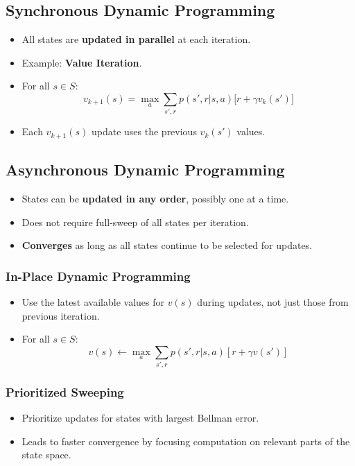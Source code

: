 \documentclass[12pt]{article}
\begin{document}
\subsection{Synchronous Dynamic Programming}
\begin{itemize}
    \item All states are \textbf{updated in parallel} at each iteration.
    \item Example: \textbf{Value Iteration}.
    \item For all $s \in S$:
        $$
        v_{k+1}(s) = \max_{a} \sum_{s',r} p(s',r|s,a)\big[r + \gamma v_k(s')\big]
        $$
    \item Each $v_{k+1}(s)$ update uses the previous $v_k(s')$ values.
\end{itemize}

\subsection{Asynchronous Dynamic Programming}
\begin{itemize}
    \item States can be \textbf{updated in any order}, possibly one at a time.
    \item Does not require full-sweep of all states per iteration.
    \item \textbf{Converges} as long as all states continue to be selected for updates.
\end{itemize}

\subsubsection{In-Place Dynamic Programming}
\begin{itemize}
    \item Use the latest available values for $v(s)$ during updates, not just those from previous iteration.
    \item For all $s \in S$:
        $$
        v(s) \leftarrow \max_{a} \sum_{s',r} p(s',r|s,a)[r + \gamma v(s')]
        $$
\end{itemize}

\subsubsection{Prioritized Sweeping}
\begin{itemize}
    \item Prioritize updates for states with largest Bellman error.
    \item Leads to faster convergence by focusing computation on relevant parts of the state space.
\end{itemize}
\end{document}
